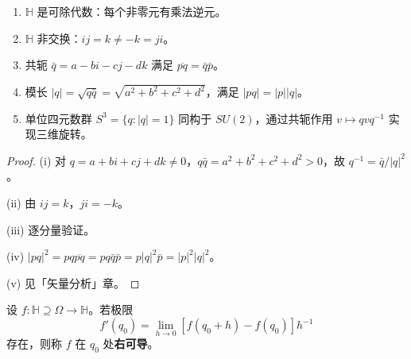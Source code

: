 \begin{proposition}[四元数的基本性质]\label{prop:ca_quaternion_props}
\begin{enumerate}[label=(\roman*)]
    \item $\mathbb{H}$ 是可除代数：每个非零元有乘法逆元。
    \item $\mathbb{H}$ 非交换：$ij = k \neq -k = ji$。
    \item 共轭 $\bar{q} = a - bi - cj - dk$ 满足 $\overline{pq} = \bar{q} \bar{p}$。
    \item 模长 $|q| = \sqrt{q\bar{q}} = \sqrt{a^2 + b^2 + c^2 + d^2}$，满足 $|pq| = |p| |q|$。
    \item 单位四元数群 $S^3 = \{q : |q| = 1\}$ 同构于 $SU(2)$，通过共轭作用 $v \mapsto qvq^{-1}$ 实现三维旋转。
\end{enumerate}
\end{proposition}

\begin{proof}
(i) 对 $q = a + bi + cj + dk \neq 0$，$q\bar{q} = a^2 + b^2 + c^2 + d^2 > 0$，故 $q^{-1} = \bar{q}/|q|^2$。

(ii) 由 $ij = k$，$ji = -k$。

(iii) 逐分量验证。

(iv) $|pq|^2 = pq \overline{pq} = pq \bar{q} \bar{p} = p|q|^2 \bar{p} = |p|^2 |q|^2$。

(v) 见「矢量分析」章。
\end{proof}

\begin{definition}[四元数解析函数]\label{def:ca_quaternion_analytic}
设 $f: \mathbb{H} \supseteq \Omega \to \mathbb{H}$。若极限
\[
f'(q_0) = \lim_{h \to 0} [f(q_0 + h) - f(q_0)] h^{-1}
\]
存在，则称 $f$ 在 $q_0$ 处\textbf{右可导}。
\end{definition}

